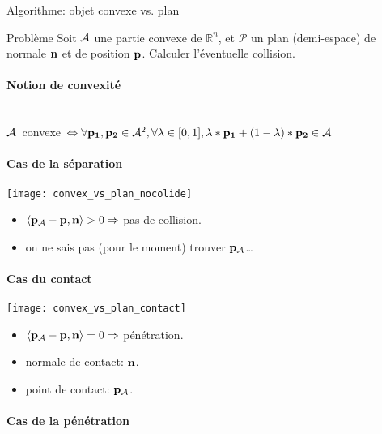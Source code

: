\begin{frame}[fragile]{Algorithme: objet convexe vs. plan}
     {
    \begin{block}{Problème}
        Soit $\mathcal{A}$ une partie convexe de $\mathbb{R}^n$, et
        $\mathcal{P}$ un plan (demi-espace) de normale ${\bf n}$ et de position $\textbf{p}$.
        Calculer l’éventuelle collision.
    \end{block}
    }
     {
         {
            \framesubtitle{Notion de convexité}
                \mbox{}\\
                $\mathcal{A}$~convexe~$\Leftrightarrow \forall {\bf p_1}, {\bf p_2} \in \mathcal{A}^2, \forall \lambda \in [0, 1], \lambda *
                {\bf p_1} + (1 - \lambda) * {\bf p_2} \in \mathcal{A}$
                \begin{figure}[h]
                    \setcounter{subfigure}{0}
                \end{figure}
        }
        {
            \framesubtitle{Cas de la séparation}
           \begin{center}
               \texttt{[image: convex\_vs\_plan\_nocolide]}
           \end{center}
           \begin{itemize}
               \item $\left< {\bf p_\mathcal{A}} - \textbf{p}, {\bf n} \right> > 0 \Rightarrow$ pas de collision.
               \item on ne sais pas (pour le moment) trouver ${\bf p_\mathcal{A}}$\ldots
           \end{itemize}
       }
        {
            \framesubtitle{Cas du contact}
           \begin{center}
               \texttt{[image: convex\_vs\_plan\_contact]}
           \end{center}
           \begin{itemize}
               \item $\left< {\bf p_\mathcal{A}} - \textbf{p}, {\bf n} \right> = 0 \Rightarrow$ pénétration.
               \item normale de contact: ${\bf n}$.
               \item point de contact: ${\bf p_\mathcal{A}}$.
           \end{itemize}
       }
        {
            \framesubtitle{Cas de la pénétration}
           \begin{center}

\end{center}}}
\end{frame}
